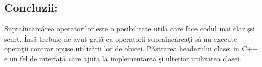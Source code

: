 \subsection{Concluzii:}
Supra\^{i}ncarc\v{a}rea operatorilor este o posibilitate util\v{a} care face codul mai
clar \c{s}si scurt. \^{I}ns\v{a} trebuie de avut grij\v{a} ca operatorii supra\v{i}nc\v{a}rca\c{t}i
s\v{a} nu execute opera\c{t}ii contrar opuse utiliz\v{a}rii lor de obicei. P\v{a}strarea
headerului clasei in C++ e un fel de interfa\c{t}\v{a} care ajuta la implementarea \c{s}i
ulterior utilizarea clasei.

